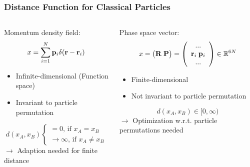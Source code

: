 \documentclass[9pt, english]{beamer}
\begin{document}
\begin{frame}
\frametitle{Distance Function for Classical Particles}
\begin{columns}[t]
\begin{column}{0.45\textwidth}
\vspace{0.25cm}
Momentum density field:
\[
 x = \sum_{i=1}^N{\vb{p}_i \delta(\vb{r} - \vb{r}_i)}
\]
\vspace{0.2cm}
\begin{itemize}
 \item Infinite-dimensional (Function space)
 \item Invariant to particle permutation
\end{itemize}
\vspace{0.2cm}
\[
 d(x_A,x_B)
        \begin{cases}
         = 0\text{, if } x_A = x_B \\
         \rightarrow \infty\text{, if } x_A \neq x_B 
        \end{cases}
\]
\(\rightarrow\) Adaption needed for finite distance
\end{column}
\begin{column}{0.49\textwidth}
Phase space vector:
\vspace{0.1cm}
\[
        x = 
        \big(\vb{R} \; \vb{P}\big) = 
        \left(
        \begin{array}{c}
         ... \\
         \vb{r}_i \; \vb{p}_i \\
         ... \\
         \end{array}
        \right)
        \in \mathbb{R}^{6N}
\]
\begin{itemize}
 \item Finite-dimensional
 \item Not invariant to particle permutation
\end{itemize}
\vspace{0.95cm}
\[
 d(x_A,x_B) \in [0, \infty)
\]
\(\rightarrow\) Optimization w.r.t. particle permutations needed
\end{column}
\end{columns}
\end{frame}
\end{document}
